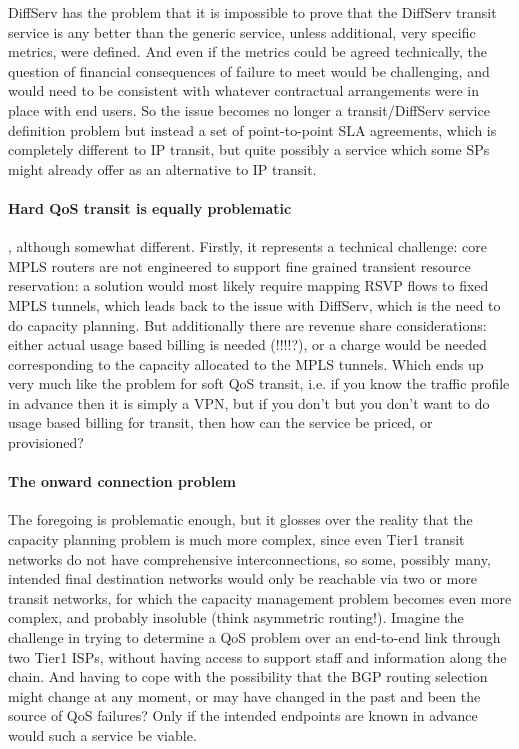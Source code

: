 DiffServ has the problem that it is impossible to prove that the DiffServ transit service is any better than the generic service, unless additional, very specific metrics, were defined.
And even if the metrics could be agreed technically, the question of financial consequences of failure to meet would be challenging, and would need to be consistent with whatever contractual arrangements were in place with end users.
So the issue becomes no longer a transit/DiffServ service definition problem but instead a set of point-to-point SLA agreements, which is completely different to IP transit, but quite possibly a service which some SPs might already offer as an alternative to IP transit.

\paragraph{Hard QoS transit is equally problematic}
, although somewhat different.
Firstly, it represents a technical challenge: core MPLS routers are not engineered to support fine grained transient resource reservation: a solution would most likely require mapping RSVP flows to fixed MPLS tunnels, which leads back to the issue with DiffServ, which is the need to do capacity planning.
But additionally there are revenue share considerations: either actual usage based billing is needed (!!!!?), or a charge would be needed corresponding to the capacity allocated to the MPLS tunnels.
Which ends up very much like the problem for soft QoS transit, i.e. if you know the traffic profile in advance then it is simply a VPN, but if you don’t but you don’t want to do usage based billing for transit, then how can the service be priced, or provisioned?

\paragraph{The onward connection problem}

The foregoing is problematic enough, but it glosses over the reality that the capacity planning problem is much more complex, since even Tier1 transit networks do not have comprehensive interconnections, so some, possibly many, intended final destination networks would only be reachable via two or more transit networks, for which the capacity management problem becomes even more complex, and probably insoluble (think asymmetric routing!).
Imagine the challenge in trying to determine a QoS problem over an end-to-end link through two Tier1 ISPs, without having access to support staff and information along the chain.
And having to cope with the possibility that the BGP routing selection might change at any moment, or may have changed in the past and been the source of QoS failures?
Only if the intended endpoints are known in advance would such a service be viable.

